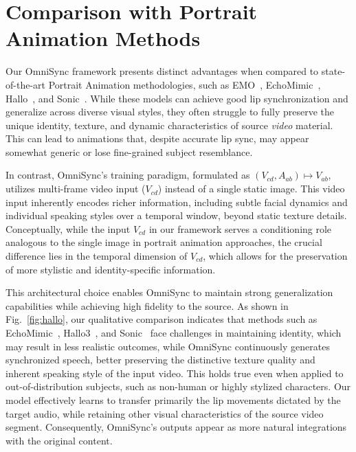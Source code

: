 \section{Comparison with Portrait Animation Methods}

Our OmniSync framework presents distinct advantages when compared to state-of-the-art Portrait Animation methodologies, such as EMO~\cite{tian2024emo}, EchoMimic~\cite{chen2025echomimic}, Hallo~\cite{xu2024hallo}, and Sonic~\cite{ji2024sonic}. While these models can achieve good lip synchronization and generalize across diverse visual styles, they often struggle to fully preserve the unique identity, texture, and dynamic characteristics of source \textit{video} material. This can lead to animations that, despite accurate lip sync, may appear somewhat generic or lose fine-grained subject resemblance.

In contrast, OmniSync's training paradigm, formulated as $(V_{cd}, A_{ab}) \mapsto V_{ab}$, utilizes multi-frame video input ($V_{cd}$) instead of a single static image. This video input inherently encodes richer information, including subtle facial dynamics and individual speaking styles over a temporal window, beyond static texture details. Conceptually, while the input $V_{cd}$ in our framework serves a conditioning role analogous to the single image in portrait animation approaches, the crucial difference lies in the temporal dimension of $V_{cd}$, which allows for the preservation of more stylistic and identity-specific information.

This architectural choice enables OmniSync to maintain strong generalization capabilities while achieving high fidelity to the source. 
As shown in Fig.~\ref{fig:hallo}, our qualitative comparison indicates that methods such as EchoMimic~\cite{chen2025echomimic}, Hallo3~\cite{cui2024hallo3}, and Sonic~\cite{ji2024sonic} face challenges in maintaining identity, which may result in less realistic outcomes, while OmniSync continuously generates synchronized speech, better preserving the distinctive texture quality and inherent speaking style of the input video.
This holds true even when applied to out-of-distribution subjects, such as non-human or highly stylized characters. Our model effectively learns to transfer primarily the lip movements dictated by the target audio, while retaining other visual characteristics of the source video segment. Consequently, OmniSync's outputs appear as more natural integrations with the original content.

